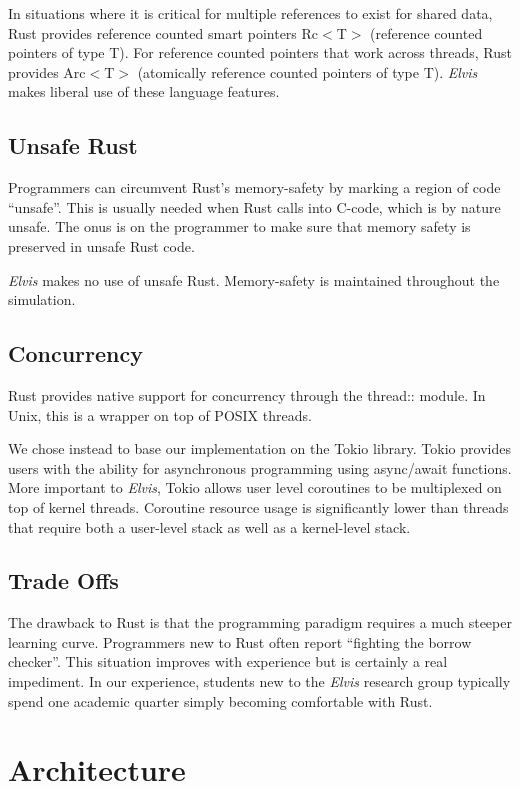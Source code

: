 \documentclass[journal]{IEEEtran} %
\newcommand{\elvis}{\textit{Elvis}}
\begin{document}
In situations where it is critical for multiple references to exist for shared data, Rust provides reference counted smart pointers Rc$<$T$>$ (reference counted pointers of type T). For reference counted pointers that work across threads, Rust provides Arc$<$T$>$ (atomically reference counted pointers of type T). \elvis{} makes liberal use of these language features.

\subsection{Unsafe Rust}

Programmers can circumvent Rust's memory-safety by marking a region of code ``unsafe''. This is usually needed when Rust calls into C-code, which is by nature unsafe. The onus is on the programmer to make sure that memory safety is preserved in unsafe Rust code.

\elvis{} makes no use of unsafe Rust. Memory-safety is maintained throughout the simulation.

\subsection{Concurrency}

Rust provides native support for concurrency through the thread:: module. In Unix, this is a wrapper on top of POSIX threads.

We chose instead to base our implementation on the Tokio \cite{b6} library. Tokio provides users with the ability for asynchronous programming using async/await functions. More important to \elvis{}, Tokio allows user level coroutines to be multiplexed on top of kernel threads.
Coroutine resource usage is significantly lower than threads that require both a
user-level stack as well as a kernel-level stack.

\subsection{Trade Offs}

The drawback to Rust is that the programming paradigm requires a much steeper learning curve. Programmers new to Rust often report ``fighting the borrow checker''. This situation improves with experience but is certainly a real impediment. In our experience, students new to the \elvis{} research group typically spend one academic quarter simply becoming comfortable
with Rust.

\section{Architecture}
\end{document}

